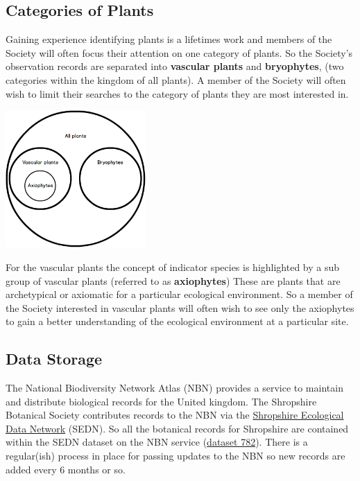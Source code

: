 \documentclass[a4paper,12pt,landscape]{article}
\begin{document}
\begin{multicols*}{2}
  \subsection{Categories of Plants}
  Gaining experience identifying plants is a lifetimes work
  and members of the Society will often
  focus their attention on one category of plants.
  So the Society's observation records
  are separated into \textbf{vascular plants} and \textbf{bryophytes},
  (two categories within the kingdom of all plants).
  A member of the Society will often wish to limit their searches to the
  category of plants they are most interested in.

  \includegraphics[width=0.4\textwidth,height=\textheight,keepaspectratio]{./wireframes/Categories.png}

  For the vascular plants
  the concept of indicator species is highlighted
  by a sub group of vascular plants
  (referred to as \textbf{axiophytes})
  These are plants that are archetypical or axiomatic for a particular ecological environment.
  So a member of the Society interested in vascular plants
  will often wish to see only the axiophytes
  to gain a better understanding of the ecological environment
  at a particular site.

  \subsection{Data Storage}
  The National Biodiversity Network Atlas (NBN)
  provides a service to maintain and distribute biological records
  for the United kingdom.
  The Shropshire Botanical Society contributes records to the NBN
  via the \href{https://sites.google.com/view/sedn/home}{Shropshire Ecological Data Network} (SEDN).
  So all the botanical records for Shropshire
  are contained within the SEDN dataset on the NBN service
  (\href{occurrences/search?q=data_resource_uid%3Adr782}{dataset 782}).
  There is a regular(ish) process in place for passing updates to the NBN
  so new records are added every 6 months or so. 


\end{multicols*}
\end{document}
